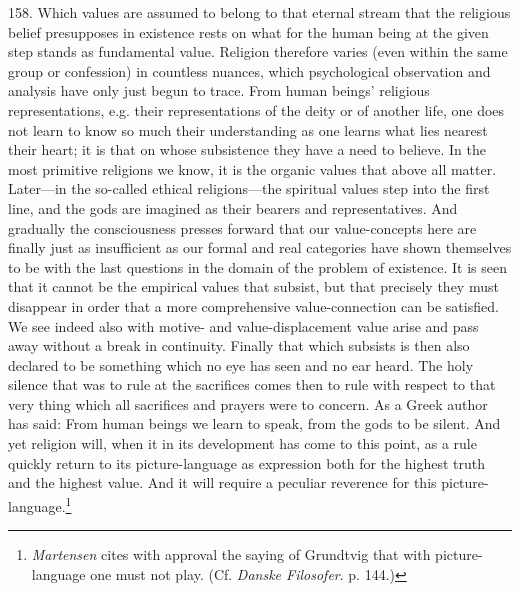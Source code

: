 \documentclass[12pt,a4paper]{book}
\newcommand{\opage}[1]{\marginnote{\footnotesize\textit{[#1]}}}
\begin{document}
158. Which values are assumed to belong to that eternal stream that the religious belief presupposes in
existence rests on what for the human being at the given step stands as fundamental value. Religion
therefore varies (even within the same group or confession) in countless nuances, which psychological
observation and analysis have only just begun to \opage{377}trace. From human beings' religious representations,
e.g. their representations of the deity or of another life, one does not learn to know so much their
understanding as one learns what lies nearest their heart; it is that on whose subsistence they have a
need to believe. In the most primitive religions we know, it is the organic values that above all matter.
Later---in the so-called ethical religions---the spiritual values step into the first line, and the gods
are imagined as their bearers and representatives. And gradually the consciousness presses forward that
our value-concepts here are finally just as insufficient as our formal and real categories have shown
themselves to be with the last questions in the domain of the problem of existence. It is seen that it
cannot be the empirical values that subsist, but that precisely they must disappear in order that a more
comprehensive value-connection can be satisfied. We see indeed also with motive- and value-displacement
value arise and pass away without a break in continuity. Finally that which subsists is then also declared
to be something which no eye has seen and no ear heard. The holy silence that was to rule at the
sacrifices comes then to rule with respect to that very thing which all sacrifices and prayers were to
concern. As a Greek author has said: From human beings we learn to speak, from the gods to be silent. And yet religion will, when it in its development has come to this point, as a rule quickly
return to its picture-language as expression both for the highest truth and the highest value. And it
will require a peculiar reverence for this picture-language.\footnote{\emph{Martensen} cites with
approval the saying of Grundtvig that with picture-language one must not play. (Cf. \emph{Danske
Filosofer}. p. 144.)}
\end{document}
